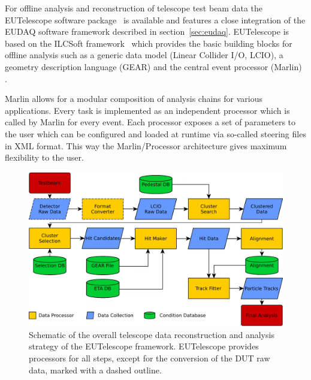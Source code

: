 

For offline analysis and reconstruction of telescope test beam data the EUTelescope software package~\cite{ref:eudetmemo_2010_12,ref:eutelwebsite}
 is available and features a close integration of the EUDAQ software framework described in section~\ref{sec:eudaq}.
EUTelescope is based on the ILCSoft framework~\cite{ref:eudetmemo_2009_12} which provides the basic building blocks for offline analysis such as a generic data model (Linear Collider I/O, LCIO),
a geometry description language (GEAR) and the central event processor (Marlin) \cite{ref:eudetreport_2007_11}.

Marlin allows for a modular composition of analysis chains for various applications. Every task is implemented as an independent processor which is called by Marlin for every event. 
Each processor exposes a set of parameters to the user which can be configured and loaded at runtime via so-called steering files in XML format.
This way the Marlin/Processor architecture gives maximum flexibility to the user.

\begin{figure}[tbp]
  \center
  \includegraphics[width=.9\textwidth]{figures/eutel-strategy}
  \caption[The EUTelescope data analysis strategy]{Schematic of the overall telescope data reconstruction and analysis strategy of the EUTelescope framework.
EUTelescope provides processors for all steps, except for the conversion of the DUT raw data, marked with a dashed outline.}
  \label{fig:offline:strategy}
\end{figure}

